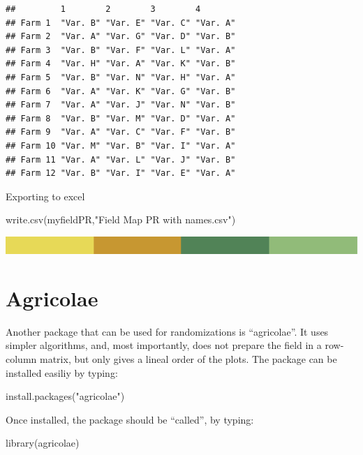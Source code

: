 \documentclass[
]{book}
\newenvironment{Shaded}{\begin{snugshade}}{\end{snugshade}}
\newcommand{\FunctionTok}[1]{\textcolor[rgb]{0.00,0.00,0.00}{#1}}
\newcommand{\NormalTok}[1]{#1}
\newcommand{\StringTok}[1]{\textcolor[rgb]{0.31,0.60,0.02}{#1}}
\begin{document}
\begin{verbatim}
##         1        2        3        4       
## Farm 1  "Var. B" "Var. E" "Var. C" "Var. A"
## Farm 2  "Var. A" "Var. G" "Var. D" "Var. B"
## Farm 3  "Var. B" "Var. F" "Var. L" "Var. A"
## Farm 4  "Var. H" "Var. A" "Var. K" "Var. B"
## Farm 5  "Var. B" "Var. N" "Var. H" "Var. A"
## Farm 6  "Var. A" "Var. K" "Var. G" "Var. B"
## Farm 7  "Var. A" "Var. J" "Var. N" "Var. B"
## Farm 8  "Var. B" "Var. M" "Var. D" "Var. A"
## Farm 9  "Var. A" "Var. C" "Var. F" "Var. B"
## Farm 10 "Var. M" "Var. B" "Var. I" "Var. A"
## Farm 11 "Var. A" "Var. L" "Var. J" "Var. B"
## Farm 12 "Var. B" "Var. I" "Var. E" "Var. A"
\end{verbatim}

Exporting to excel

\begin{Shaded}
\begin{Highlighting}[]
\FunctionTok{write.csv}\NormalTok{(myfieldPR,}\StringTok{"Field Map PR with names.csv"}\NormalTok{)}
\end{Highlighting}
\end{Shaded}

\includegraphics{rsrstrip.png}

\hypertarget{agricolae}{%
\section{Agricolae}\label{agricolae}}

Another package that can be used for randomizations is ``agricolae''. It uses simpler algorithms, and, most importantly, does not prepare the field in a row-column matrix, but only gives a lineal order of the plots. The package can be installed easiliy by typing:

\begin{Shaded}
\begin{Highlighting}[]
\FunctionTok{install.packages}\NormalTok{(}\StringTok{"agricolae"}\NormalTok{)}
\end{Highlighting}
\end{Shaded}

Once installed, the package should be ``called'', by typing:

\begin{Shaded}
\begin{Highlighting}[]
\FunctionTok{library}\NormalTok{(agricolae)}
\end{Highlighting}
\end{Shaded}
\end{document}
